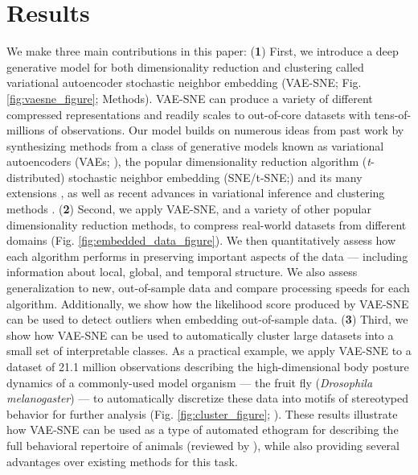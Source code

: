 \documentclass[11pt,a4paper,oneside]{book}
\begin{document}
\section{Results}
We make three main contributions in this paper: (\textbf{1}) First, we introduce a deep generative model for both dimensionality reduction and clustering called variational autoencoder stochastic neighbor embedding (VAE-SNE; Fig. \ref{fig:vaesne_figure}; Methods). VAE-SNE can produce a variety of different compressed representations and readily scales to out-of-core datasets with tens-of-millions of observations. Our model builds on numerous ideas from past work by synthesizing methods from a class of generative models known as variational autoencoders (VAEs; \citealt{kingma2013vae}), the popular dimensionality reduction algorithm (\textit{t}-distributed) stochastic neighbor embedding (SNE/t-SNE;\citealt{hinton2003stochastic, maaten2008tsne}) and its many extensions \citep{van2009ptsne, wang2016vmf, chien2017variational, ding2018scvis}, as well as recent advances in variational inference \citep{kingma2014semi, burda2015iwae, dilokthanakul2016gmvae, cremer2017reinterpreting, tomczak2017vae} and clustering methods \citep{todd2017systematic}. (\textbf{2}) Second, we apply VAE-SNE, and a variety of other popular dimensionality reduction methods, to compress real-world datasets from different domains (Fig. \ref{fig:embedded_data_figure}). We then quantitatively assess how each algorithm performs in preserving important aspects of the data --- including information about local, global, and temporal structure. We also assess generalization to new, out-of-sample data and compare processing speeds for each algorithm. Additionally, we show how the likelihood score produced by VAE-SNE can be used to detect outliers when embedding out-of-sample data. (\textbf{3}) Third, we show how VAE-SNE can be used to automatically cluster large datasets into a small set of interpretable classes. As a practical example, we apply VAE-SNE to a dataset of 21.1 million observations describing the high-dimensional body posture dynamics of a commonly-used model organism --- the fruit fly (\textit{Drosophila melanogaster}) --- to automatically discretize these data into motifs of stereotyped behavior for further analysis (Fig. \ref{fig:cluster_figure}; \citealt{berman2014mapping, pereira2019fast}). These results illustrate how VAE-SNE can be used as a type of automated ethogram for describing the full behavioral repertoire of animals (reviewed by \citealt{anderson2014toward, berman2018measuring, brown2018ethology, datta2019computational}), while also providing several advantages over existing methods for this task.
\end{document}
